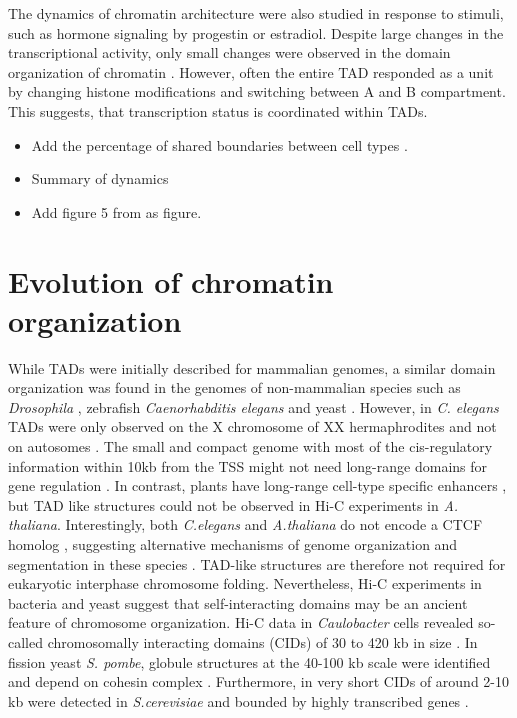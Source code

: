 \documentclass[a4paper,twoside=true,openright,parskip=full,chapterprefix=true,11pt,headings=normal,bibliography=totoc,listof=totoc,titlepage=on,captions=tableabove,draft=false]{scrreprt}
\providecommand{\tightlist}{%
  \setlength{\itemsep}{0pt}\setlength{\parskip}{0pt}}
\theoremstyle{definition}
\theoremstyle{definition}
\theoremstyle{definition}
\theoremstyle{remark}
\begin{document}
The dynamics of chromatin architecture were also studied in response to
stimuli, such as hormone signaling by progestin or estradiol. Despite
large changes in the transcriptional activity, only small changes were
observed in the domain organization of chromatin \citep{LeDily2014}.
However, often the entire TAD responded as a unit by changing histone
modifications and switching between A and B compartment. This suggests,
that transcription status is coordinated within TADs.

\begin{itemize}
\tightlist
\item
  Add the percentage of shared boundaries between cell types
  \citep{Dixon2012, Rao2014}.
\item
  Summary of dynamics
\item
  Add figure 5 from \citep{Andrey2017} as figure.
\end{itemize}

\hypertarget{evolution-of-chromatin-organization}{%
\section{Evolution of chromatin
organization}\label{evolution-of-chromatin-organization}}

While TADs were initially described for mammalian genomes, a similar
domain organization was found in the genomes of non-mammalian species
such as \emph{Drosophila} \citep{Sexton2012}, zebrafish
\citep{Gomez-Marin2015} \emph{Caenorhabditis elegans} \citep{Crane2015}
and yeast \citep{Hsieh2015, Mizuguchi2014}. However, in \emph{C.
elegans} TADs were only observed on the X chromosome of XX
hermaphrodites and not on autosomes \citep{Crane2015}. The small and
compact genome with most of the cis-regulatory information within 10kb
from the TSS might not need long-range domains for gene regulation
\citep{Long2016}. In contrast, plants have long-range cell-type specific
enhancers \citep{Zhu2015}, but TAD like structures could not be observed
in Hi-C experiments in \emph{A. thaliana}. Interestingly, both
\emph{C.elegans} and \emph{A.thaliana} do not encode a CTCF homolog
\citep{Heger2012}, suggesting alternative mechanisms of genome
organization and segmentation in these species \citep{Long2016}.
TAD-like structures are therefore not required for eukaryotic interphase
chromosome folding. Nevertheless, Hi-C experiments in bacteria and yeast
suggest that self-interacting domains may be an ancient feature of
chromosome organization. Hi-C data in \emph{Caulobacter} cells revealed
so-called chromosomally interacting domains (CIDs) of 30 to 420 kb in
size \citep{Le2013}. In fission yeast \emph{S. pombe}, globule
structures at the 40-100 kb scale were identified and depend on cohesin
complex \citep{Mizuguchi2014}. Furthermore, in very short CIDs of around
2-10 kb were detected in \emph{S.cerevisiae} and bounded by highly
transcribed genes \citep{Hsieh2015}.
\end{document}
